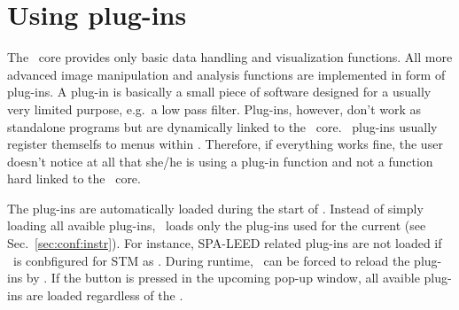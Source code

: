 
\chapter{Using plug-ins}
\label{ch:plugins-use}

The \Gxsm\ core provides only basic data handling and visualization
functions.  All more advanced image manipulation and analysis functions are
implemented in form of plug-ins.  A plug-in is basically a small piece of
software designed for a usually very limited purpose, e.g.\ a low pass
filter.  Plug-ins, however, don't work as standalone programs but are
dynamically linked to the \Gxsm\ core.  \Gxsm\ plug-ins usually register
themselfs to menus within \Gxsm.  Therefore, if everything works fine, the
user doesn't notice at all that she/he is using a plug-in function and not a
function hard linked to the \Gxsm\ core.

The plug-ins are automatically loaded during the start of \Gxsm.  Instead of
simply loading all avaible plug-ins, \Gxsm\ loads only the plug-ins used for
the current  (see Sec.\ \ref{sec:conf:instr}).
For instance, SPA-LEED related plug-ins are not loaded if \Gxsm\ is
conbfigured for STM as .  During runtime, \Gxsm\
can be forced to reload the plug-ins by .
If the \GxsmEmph{Load All} button is pressed in the upcoming pop-up window,
all avaible plug-ins are loaded regardless of the \GxsmEmph{Instrument type}.

